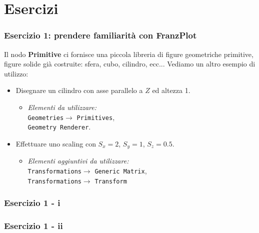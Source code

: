 \documentclass{beamer}
\newcommand{\fig}{figures}
\newcommand{\frnzplt}{FranzPlot }
\begin{document}
\section{Esercizi}
\begin{frame}
\frametitle{Esercizio 1: prendere familiarit\`a con \frnzplt}
Il nodo \textbf{Primitive} ci fornisce una piccola libreria di figure geometriche primitive, figure solide gi\`a costruite:
    sfera, cubo, cilindro, ecc...
    \vspace {0.75 cm}
Vediamo un altro esempio di utilizzo:
\begin{itemize}
\item Disegnare un cilindro con asse parallelo a $Z$ ed altezza 1.
\begin{itemize}
\item \textit{Elementi da utilizzare:} \\ \texttt{Geometries}$\rightarrow$ \texttt{Primitives}, \\ \texttt{Geometry Renderer}.
\end{itemize}
    \vspace {0.75 cm}
\item Effettuare uno scaling con $S_x =2$, $S_y=1$, $S_z=0.5$.
\begin{itemize}
\item \textit{Elementi aggiuntivi da utilizzare:} \\ \texttt{Transformations}$\rightarrow$ \texttt{Generic Matrix}, \\ \texttt{Transformations}$\rightarrow$ \texttt{Transform}
\end{itemize}
\end{itemize}
\end{frame}
\begin{frame}
\frametitle{Esercizio 1 - i}
\begin{center}
\end{center}
\end{frame}
\begin{frame}
\frametitle{Esercizio 1 - ii}
\begin{center}
\end{center}
\end{frame}
\end{document}
